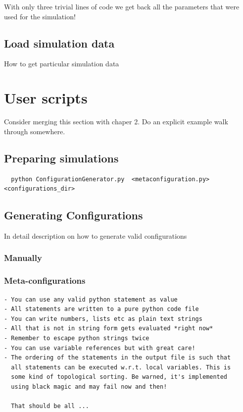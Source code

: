\documentclass[a4paper,10pt]{report}
\begin{document}
With only three trivial lines of code we get back all the parameters
that were used for the simulation!

\subsection{Load simulation data}

How to get particular simulation data


\section{User scripts}

Consider merging this section with chaper 2.
Do an explicit example walk through somewhere.

\subsection{Preparing simulations}

\begin{verbatim}
  python ConfigurationGenerator.py  <metaconfiguration.py> <configurations_dir>
\end{verbatim}


\subsection{Generating Configurations}

In detail description on how to generate valid configurations

\subsubsection{Manually}

\subsubsection{Meta-configurations}

\begin{verbatim}
- You can use any valid python statement as value
- All statements are written to a pure python code file
- You can write numbers, lists etc as plain text strings
- All that is not in string form gets evaluated *right now*
- Remember to escape python strings twice
- You can use variable references but with great care!
- The ordering of the statements in the output file is such that
  all statements can be executed w.r.t. local variables. This is
  some kind of topological sorting. Be warned, it's implemented
  using black magic and may fail now and then!

  That should be all ...
\end{verbatim}
\end{document}
